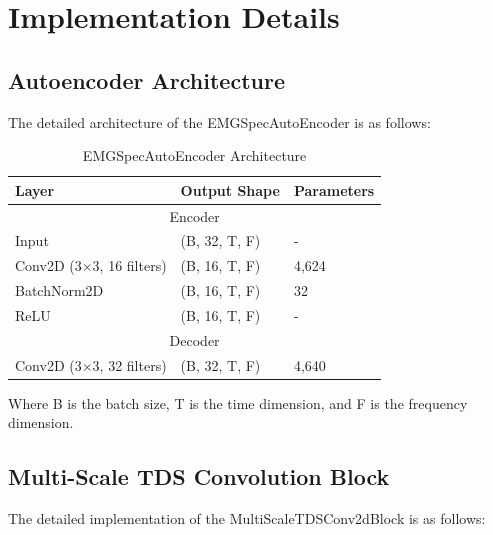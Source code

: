 \section{Implementation Details}

\subsection{Autoencoder Architecture}

The detailed architecture of the EMGSpecAutoEncoder is as follows:

\begin{table}[h]
    \centering
    \caption{EMGSpecAutoEncoder Architecture}
    \begin{tabular}{lll}
        \toprule
        Layer                    & Output Shape  & Parameters \\
        \midrule
        \multicolumn{3}{c}{Encoder}                           \\
        \midrule
        Input                    & (B, 32, T, F) & -          \\
        Conv2D (3×3, 16 filters) & (B, 16, T, F) & 4,624      \\
        BatchNorm2D              & (B, 16, T, F) & 32         \\
        ReLU                     & (B, 16, T, F) & -          \\
        \midrule
        \multicolumn{3}{c}{Decoder}                           \\
        \midrule
        Conv2D (3×3, 32 filters) & (B, 32, T, F) & 4,640      \\
        \bottomrule
    \end{tabular}
\end{table}

Where B is the batch size, T is the time dimension, and F is the frequency dimension.

\subsection{Multi-Scale TDS Convolution Block}

The detailed implementation of the MultiScaleTDSConv2dBlock is as follows:

